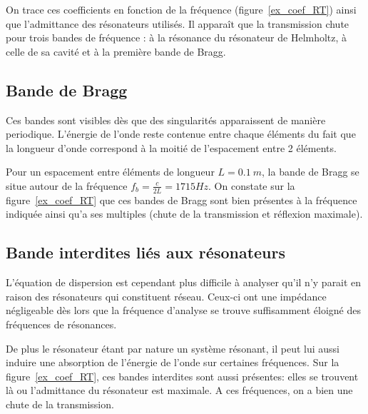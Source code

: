 On trace ces coefficients en fonction de la fréquence (figure~\ref{ex_coef_RT}) ainsi que l'admittance des résonateurs utilisés. Il apparaît que la transmission chute pour trois bandes de fréquence : à la résonance du résonateur de Helmholtz, à celle de sa cavité et à la première bande de Bragg.

\subsection{Bande de Bragg}
Ces bandes sont visibles dès que des singularités apparaissent de manière periodique. L'énergie de l'onde reste contenue entre chaque éléments du fait que la longueur d'onde correspond à la moitié de l'espacement entre 2 éléments. 

Pour un espacement entre éléments de longueur $L=0.1~m$, la bande de Bragg se situe autour de la fréquence $f_{b} = \frac{c}{2L} = 1715 Hz$. On constate sur la figure~\ref{ex_coef_RT} que ces bandes de Bragg sont bien présentes à la fréquence indiquée ainsi qu'a ses multiples (chute de la transmission et réflexion maximale).
 

\subsection{Bande interdites liés aux résonateurs}
L'équation de dispersion est cependant plus difficile à analyser qu'il n'y parait en raison des résonateurs qui constituent réseau. Ceux-ci ont une impédance négligeable dès lors que la fréquence d'analyse se trouve suffisamment éloigné des fréquences de résonances. 

De plus le résonateur étant par nature un système résonant, il peut lui aussi induire une absorption de l'énergie de l'onde sur certaines fréquences. Sur la figure~\ref{ex_coef_RT}, ces bandes interdites sont aussi présentes: elles se trouvent là ou l'admittance du résonateur est maximale. A ces fréquences, on a bien une chute de la transmission.

